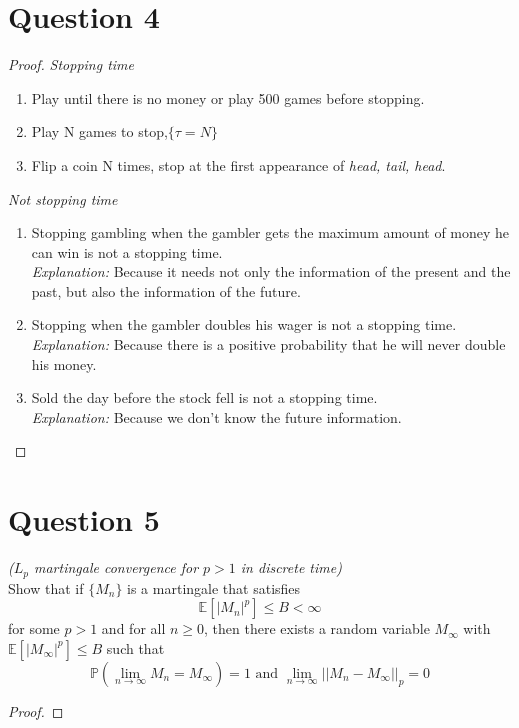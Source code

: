 \documentclass{article}
\begin{document}
\section*{Question 4}
    \begin{proof}
        \indent
        \textit{Stopping time}
        \begin{enumerate}
            \item Play until there is no money or play 500 games before stopping.
            \item Play N games to stop,$\{\tau=N\}$
            \item Flip a coin N times, stop at the first appearance of \textit{head, tail, head}.
        \end{enumerate}
        \textit{Not stopping time}
        \begin{enumerate}
            \item Stopping gambling when the gambler gets the maximum amount of money he can win is not a stopping time.\\
            \textit{Explanation:} Because it needs not only the information of the present and the past, but also the information of the future.
            \item Stopping when the gambler doubles his wager is not a stopping time.\\
            \textit{Explanation:} Because there is a positive probability that he will never double his money.
            \item Sold the day before the stock fell is not a stopping time.\\
            \textit{Explanation:} Because we don’t know the future information.
        \end{enumerate}
    \end{proof}

\section*{Question 5}
    
    \textit{($L_p$ martingale convergence for $p>1$ in discrete time)}\\
    Show that if $\{M_n\}$ is a martingale that satisfies
    $$\mathbb{E}\left[\left|M_n\right|^p\right] \leqslant B < \infty$$
    for some $p>1$ and for all $n\geqslant 0$, then there exists a random variable $M_\infty$ with $\mathbb{E}\left[\left| M_\infty\right|^p\right]\leqslant B$ such that
    $$\mathbb{P}\left(\lim_{n\to \infty}M_n = M_\infty\right)=1 \text{ and } \lim_{n\to \infty}||M_n-M_\infty||_p=0$$
    \begin{proof}
        
    \end{proof}
\end{document}
